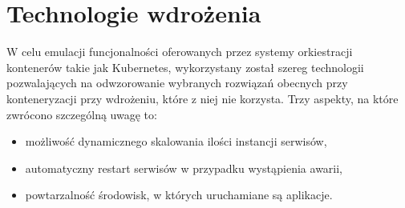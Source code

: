 \section{Technologie wdrożenia}
W celu emulacji funcjonalności oferowanych przez systemy orkiestracji kontenerów takie jak Kubernetes, wykorzystany został szereg technologii pozwalających na odwzorowanie wybranych rozwiązań obecnych przy konteneryzacji przy wdrożeniu, które z niej nie korzysta. Trzy aspekty, na które zwrócono szczególną uwagę to:
\begin{itemize}
	\item możliwość dynamicznego skalowania ilości instancji serwisów,
	\item automatyczny restart serwisów w przypadku wystąpienia awarii,
	\item powtarzalność środowisk, w których uruchamiane są aplikacje.
\end{itemize}
